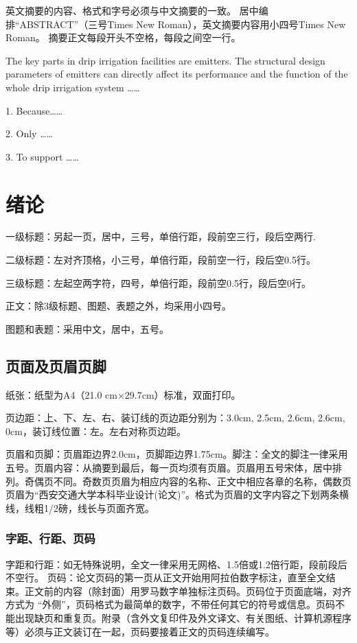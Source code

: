 \keywordscn{} %

\begin{abstracten} %

英文摘要的内容、格式和字号必须与中文摘要的一致。
居中编排“ABSTRACT”（三号Times New Roman），英文摘要内容用小四号Times New Roman。
摘要正文每段开头不空格，每段之间空一行。

The key parts in drip irrigation facilities are emitters. The structural design parameters of emitters can directly affect its performance and the function of the whole drip irrigation system ……

1. Because……

2. Only ……

3. To support ……


\end{abstracten}

\keywordsen{} %
\tableofcontents %

\mainmatter

\section{绪论}
一级标题：另起一页，居中，三号，单倍行距，段前空三行，段后空两行. 

二级标题：左对齐顶格，小三号，单倍行距，段前空一行，段后空0.5行。

三级标题：左起空两字符，四号，单倍行距，段前空0.5行，段后空0行。

正文：除3级标题、图题、表题之外，均采用小四号。

图题和表题：采用中文，居中，五号。
\subsection{页面及页眉页脚}
纸张：纸型为A4（21.0 cm×29.7cm）标准，双面打印。

页边距：上、下、左、右、装订线的页边距分别为：3.0cm, 2.5cm, 2.6cm, 2.6cm, 0cm，装订线位置：左。左右对称页边距。

页眉和页脚：页眉距边界2.0cm，页脚距边界1.75cm。脚注：全文的脚注一律采用五号。页眉内容：从摘要到最后，每一页均须有页眉。页眉用五号宋体，居中排列。奇偶页不同。奇数页页眉为相应内容的名称、正文中相应各章的名称，偶数页页眉为“西安交通大学本科毕业设计(论文)”。格式为页眉的文字内容之下划两条横线，线粗1/2磅，线长与页面齐宽。
\subsubsection{字距、行距、页码}
字距和行距：如无特殊说明，全文一律采用无网格、1.5倍或1.2倍行距，段前段后不空行。
页码：论文页码的第一页从正文开始用阿拉伯数字标注，直至全文结束。正文前的内容（除封面）用罗马数字单独标注页码。页码位于页面底端，对齐方式为 “外侧”，页码格式为最简单的数字，不带任何其它的符号或信息。页码不能出现缺页和重复页。附录（含外文复印件及外文译文、有关图纸、计算机源程序等）必须与正文装订在一起，页码要接着正文的页码连续编写。


